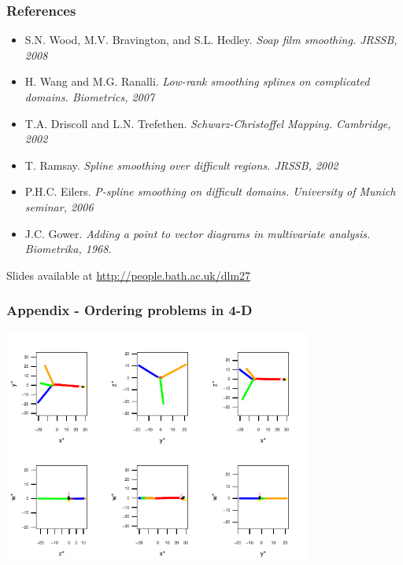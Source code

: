 \documentclass[ignorenonframetext]{beamer} %
\newcommand{\bi}{\begin{itemize}}
\newcommand{\ei}{\end{itemize}}
\begin{document}
\begin{frame}
	\frametitle{References}
       \bi
         \item S.N. Wood, M.V. Bravington, and S.L. Hedley. \emph{Soap film smoothing. JRSSB, 2008}
         \item H. Wang and M.G. Ranalli. \emph{Low-rank smoothing splines on complicated domains. Biometrics, 2007}
         \item T.A. Driscoll and L.N. Trefethen. \emph{Schwarz-Christoffel Mapping. Cambridge, 2002}
         \item T. Ramsay. \emph{Spline smoothing over difficult regions. JRSSB, 2002}
         \item P.H.C. Eilers. \emph{P-spline smoothing on difficult domains. University of Munich seminar, 2006}
	\item J.C. Gower. \emph{Adding a point to vector diagrams in multivariate analysis. Biometrika, 1968.}
        \ei
        Slides available at \url{http://people.bath.ac.uk/dlm27}
\end{frame}

\begin{frame}
	\frametitle{Appendix - Ordering problems in 4-D}
	\centering
            \includegraphics[height=3in]{figs/comb-4d.pdf}	
\end{frame}
\end{document}
